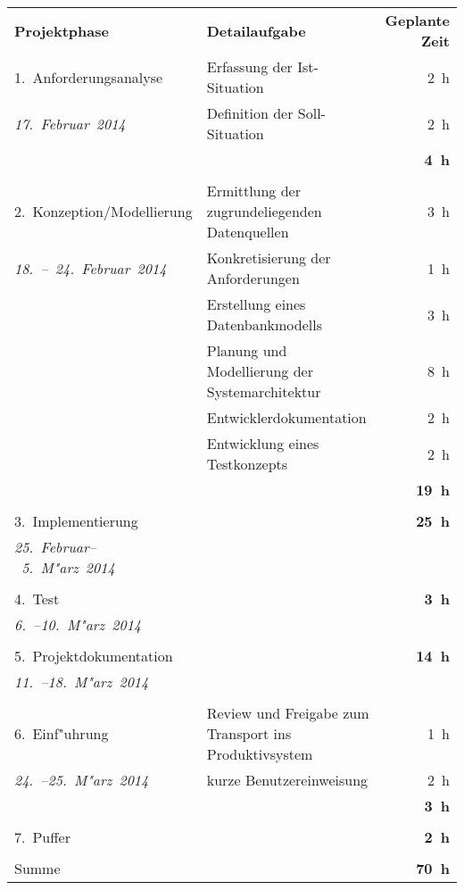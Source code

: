 \begin{tabular}{llr}
\textbf{Projektphase} & \textbf{Detailaufgabe} & \textbf{Geplante Zeit}\\
1.~Anforderungsanalyse & Erfassung der Ist-Situation & 2~h\\
\textit{17.~Februar~2014} & Definition der Soll-Situation & 2~h\\
& & \textbf{4~h}\\
& &\\
2.~Konzeption/Modellierung & Ermittlung der zugrundeliegenden
 Datenquellen & 3~h\\
\textit{18.~--~24.~Februar~2014} & Konkretisierung der
Anforderungen & 1~h\\
& Erstellung eines Datenbankmodells & 3~h\\
& Planung und Modellierung der Systemarchitektur & 8~h\\
& Entwicklerdokumentation & 2~h\\
& Entwicklung eines Testkonzepts & 2~h\\
& & \textbf{19~h}\\
& &\\
3.~Implementierung & & \textbf{25~h}\\
\textit{25.~Februar--~5.~M"arz~2014} & &\\
& &\\
4.~Test & & \textbf{3~h}\\
\textit{6.~--10.~M"arz~2014} & & \\
& &\\
5.~Projektdokumentation & & \textbf{14~h}\\
\textit{11.~--18.~M"arz~2014} & &\\
& &\\
6.~Einf"uhrung & Review und Freigabe zum Transport ins
 Produktivsystem & 1~h\\
\textit{24.~--25.~M"arz~2014} & kurze Benutzereinweisung & 2~h\\
& & \textbf{3~h}\\
& &\\
7.~Puffer & & \textbf{2~h}\\
& &\\
\midrule
Summe & & \textbf{70~h}\\
\bottomrule
\bottomrule
\end{tabular}\\
